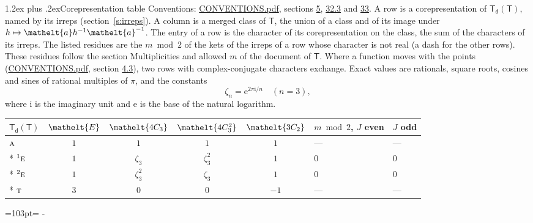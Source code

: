 \documentclass[10pt,a4paper]{article}
\makeatletter
\renewcommand\section{\@startsection{section}{1}{\z@}{-3ex plus -1ex minus -.2ex}%
  {1.2ex plus .2ex}{\normalfont\large\sffamily\bfseries\color{parttitle}}}
\newcommand{\needspace}[1]{\par\penalty-100\begingroup\dimen0=#1\relax\dimen2=\pagegoal
  \advance\dimen2-\pagetotal\ifdim\dimen0>\dimen2\relax\ifdim\dimen2>0pt\vfil\break\fi\fi
  \endgroup}
\numberwithin{equation}{section}
\newcommand{\eltfont}[1]{{\let\sigma\eltsigma\mathelt{#1}}}
\newcommand{\grp}[1]{\mathsf{#1}}
\newcommand{\irr}[1]{\text{\normalfont\scshape #1}}
\newcommand{\conjpair}[1]{{}^{#1}}
\newcommand{\cls}[1]{\eltfont{#1}}
\newcommand{\elt}[1]{\eltfont{#1}}
\newcommand{\iunit}{\mathrm{i}}
\newcommand{\expe}{\mathrm{e}}
\newcommand{\rootunity}[1]{\zeta_{#1}}
\makeatother
\begin{document}
\section{Corepresentation table}\label{s:character_table}
Conventions: \href{../../CONVENTIONS.pdf}{CONVENTIONS.pdf}, sections \href{../../../rotation/CONVENTIONS.pdf\#conv.5}{5}, \href{../../CONVENTIONS.pdf\#conv.32.3}{32.3} and \href{../../CONVENTIONS.pdf\#conv.33}{33}.
A row is a corepresentation of $\grp{T_{d}}(\grp{T})$, named by its irreps (section~\ref{s:irreps}). A column is a merged class of $\grp{T}$, the union of a class and of its image under $h \mapsto \elt{a} h^{-1} \elt{a}^{-1}$. The entry of a row is the character of its corepresentation on the class, the sum of the characters of its irreps.
\leavevmode\label{n:head.parity}The listed residues are the $m \bmod 2$ of the kets of the irreps of a row whose character is not real (a dash for the other rows). These residues follow the section Multiplicities and allowed $m$ of the document of \href{../../../rotation/data/pdf/T.pdf}{$\grp{T}$}. Where a function moves with the points (\href{../../CONVENTIONS.pdf}{CONVENTIONS.pdf}, section \href{../../../rotation/CONVENTIONS.pdf\#conv.4.3}{4.3}), two rows with complex-conjugate characters exchange.
\leavevmode\label{n:constant.root}\label{n:index.root.order}Exact values are rationals, square roots, cosines and sines of rational multiples of $\pi$, and the constants
\begin{equation}\label{e:constants}\rootunity{n} = \expe^{2\pi\iunit/n}\quad(n = 3),\end{equation}
where $\iunit$ is the imaginary unit and $\expe$ is the base of the natural logarithm.
{\small\setlength{\tabcolsep}{4pt}\begin{longtable}{@{}lccccll@{}}\toprule
$\grp{T_{d}}(\grp{T})$ & $\cls{E}$ & $\cls{4C_{3}}$ & $\cls{4C_{3}^{2}}$ & $\cls{3C_{2}}$ & $m \bmod 2$, $J$ even & $J$ odd\\\midrule\endhead
\bottomrule\endfoot\endlastfoot
$\irr{a}$ & $1$ & $1$ & $1$ & $1$ & --- & ---\\*
$\conjpair{1}\irr{e}$ & $1$ & $\rootunity{3}$ & $\rootunity{3}^{2}$ & $1$ & 0 & 0\\*
$\conjpair{2}\irr{e}$ & $1$ & $\rootunity{3}^{2}$ & $\rootunity{3}$ & $1$ & 0 & 0\\*
$\irr{t}$ & $3$ & $0$ & $0$ & $-1$ & --- & ---\\
\bottomrule\end{longtable}}
\needspace{103pt}
\end{document}
